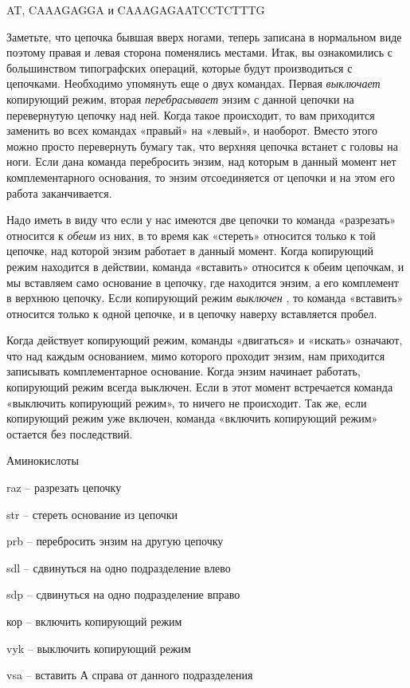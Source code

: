 \documentclass[../main.tex]{subfiles}
\begin{document}
AT, CAAAGAGGA и CAAAGAGAATCCTCTTTG

Заметьте, что цепочка бывшая вверх ногами, теперь записана в нормальном виде поэтому правая и левая сторона поменялись местами. Итак, вы ознакомились с большинством типографских операций, которые будут производиться с цепочками. Необходимо упомянуть еще о двух командах. Первая \emph{выключает} копирующий режим, вторая \emph{перебрасывает} энзим с данной цепочки на перевернутую цепочку над ней. Когда такое происходит, то вам приходится заменить во всех командах «правый» на «левый», и наоборот. Вместо этого можно просто перевернуть бумагу так, что верхняя цепочка встанет с головы на ноги. Если дана команда перебросить энзим, над которым в данный момент нет комплементарного основания, то энзим отсоединяется от цепочки и на этом его работа заканчивается.

Надо иметь в виду что если у нас имеются две цепочки то команда «разрезать» относится к \emph{обеим} из них, в то время как «стереть» относится только к той цепочке, над которой энзим работает в данный момент. Когда копирующий режим находится в действии, команда «вставить» относится к обеим цепочкам, и мы вставляем само основание в цепочку, где находится энзим, а его комплемент в верхнюю цепочку. Если копирующий режим \emph{выключен} , то команда «вставить» относится только к одной цепочке, и в цепочку наверху вставляется пробел.

Когда действует копирующий режим, команды «двигаться» и «искать» означают, что над каждым основанием, мимо которого проходит энзим, нам приходится записывать комплементарное основание. Когда энзим начинает работать, копирующий режим всегда выключен. Если в этот момент встречается команда «выключить копирующий режим», то ничего не происходит. Так же, если копирующий режим уже включен, команда «включить копирующий режим» остается без последствий.

Аминокислоты

raz \--- разрезать цепочку

str \--- стереть основание из цепочки

prb \--- перебросить энзим на другую цепочку

sdl \--- сдвинуться на одно подразделение влево

sdp \--- сдвинуться на одно подразделение вправо

кор \--- включить копирующий режим

vyk \--- выключить копирующий режим

vsa \--- вставить А справа от данного подразделения
\end{document}
